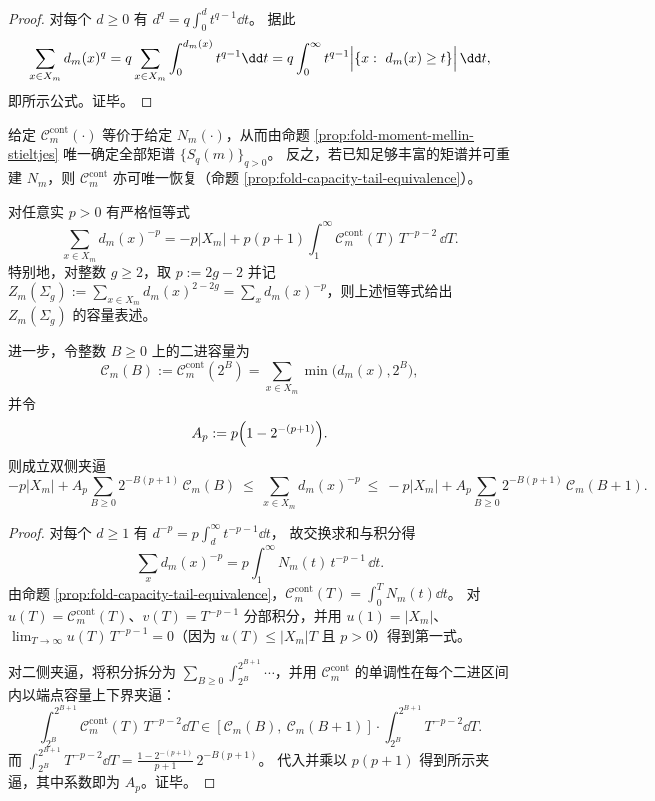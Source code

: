 \begin{proof}
对每个 \(d\ge 0\) 有 \(d^q=q\int_{0}^{d}t^{q-1}\dd t\)。
据此
\[
\sum_{x\in X_m}d_m(x)^q
=q\sum_{x\in X_m}\int_{0}^{d_m(x)} t^{q-1}\dd t
=q\int_{0}^{\infty} t^{q-1}\Bigl|\{x:\ d_m(x)\ge t\}\Bigr|\,\dd t,
\]
即所示公式。证毕。
\end{proof}

\begin{corollary}\label{cor:fold-capacity-moment-completeness}
给定 \(\mathcal{C}_m^{\mathrm{cont}}(\cdot)\) 等价于给定 \(N_m(\cdot)\)，从而由命题 \ref{prop:fold-moment-mellin-stieltjes} 唯一确定全部矩谱 \(\{S_q(m)\}_{q>0}\)。
反之，若已知足够丰富的矩谱并可重建 \(N_m\)，则 \(\mathcal{C}_m^{\mathrm{cont}}\) 亦可唯一恢复（命题 \ref{prop:fold-capacity-tail-equivalence}）。
\end{corollary}

\begin{proposition}[负阶幂和的容量表示与二进夹逼]\label{prop:fold-negative-moments-capacity-mellin}
对任意实 \(p>0\) 有严格恒等式
\[
\sum_{x\in X_m} d_m(x)^{-p}
=
-p|X_m|+p(p+1)\int_{1}^{\infty}\mathcal{C}_m^{\mathrm{cont}}(T)\,T^{-p-2}\,\dd T.
\]
特别地，对整数 \(g\ge 2\)，取 \(p:=2g-2\) 并记
\(
Z_m(\Sigma_g):=\sum_{x\in X_m}d_m(x)^{2-2g}=\sum_x d_m(x)^{-p}
\)，则上述恒等式给出 \(Z_m(\Sigma_g)\) 的容量表述。
\par
进一步，令整数 \(B\ge 0\) 上的二进容量为
\[
\mathcal{C}_m(B):=\mathcal{C}_m^{\mathrm{cont}}(2^B)=\sum_{x\in X_m}\min\bigl(d_m(x),2^B\bigr),
\]
并令
\[
A_p:=p\Bigl(1-2^{-(p+1)}\Bigr).
\]
则成立双侧夹逼
\[
-p|X_m|+A_p\sum_{B\ge 0}2^{-B(p+1)}\,\mathcal{C}_m(B)
\ \le\
\sum_{x\in X_m} d_m(x)^{-p}
\ \le\
-p|X_m|+A_p\sum_{B\ge 0}2^{-B(p+1)}\,\mathcal{C}_m(B+1).
\]
\end{proposition}
\begin{proof}
对每个 \(d\ge 1\) 有
\(
d^{-p}=p\int_{d}^{\infty}t^{-p-1}\dd t
\)，
故交换求和与积分得
\[
\sum_x d_m(x)^{-p}
=p\int_{1}^{\infty}N_m(t)\,t^{-p-1}\,\dd t.
\]
由命题 \ref{prop:fold-capacity-tail-equivalence}，\(\mathcal{C}_m^{\mathrm{cont}}(T)=\int_{0}^{T}N_m(t)\dd t\)。
对 \(u(T)=\mathcal{C}_m^{\mathrm{cont}}(T)\)、\(v(T)=T^{-p-1}\) 分部积分，并用 \(u(1)=|X_m|\)、\(\lim_{T\to\infty}u(T)\,T^{-p-1}=0\)（因为 \(u(T)\le |X_m|T\) 且 \(p>0\)）得到第一式。
\par
对二侧夹逼，将积分拆分为 \(\sum_{B\ge 0}\int_{2^B}^{2^{B+1}}\cdots\)，并用 \(\mathcal{C}_m^{\mathrm{cont}}\) 的单调性在每个二进区间内以端点容量上下界夹逼：
\[
\int_{2^B}^{2^{B+1}}\mathcal{C}_m^{\mathrm{cont}}(T)\,T^{-p-2}\dd T
\in
\left[\mathcal{C}_m(B),\ \mathcal{C}_m(B+1)\right]\cdot \int_{2^B}^{2^{B+1}}T^{-p-2}\dd T.
\]
而
\(
\int_{2^B}^{2^{B+1}}T^{-p-2}\dd T
=\frac{1-2^{-(p+1)}}{p+1}\,2^{-B(p+1)}
\)。
代入并乘以 \(p(p+1)\) 得到所示夹逼，其中系数即为 \(A_p\)。证毕。
\end{proof}

